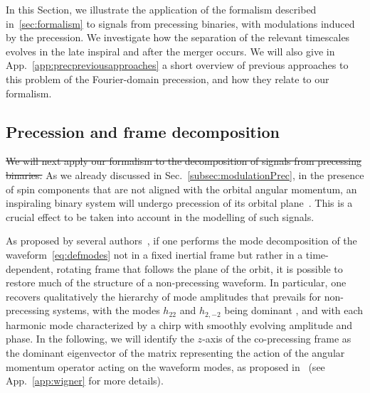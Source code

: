 \documentclass[aps,showpacs,twocolumn,
prd,superscriptaddress,nofootinbib]{revtex4-1}
\newcommand{\jgb}[1]{{\color{DarkGreen} #1}}
\begin{document}
In this Section, we illustrate the application of the formalism described in~\ref{sec:formalism} to signals from precessing binaries, with modulations induced by the precession. We investigate how the separation of the relevant timescales evolves in the late inspiral and after the merger occurs. We will also give in App.~\ref{app:precpreviousapproaches} a short overview of previous approaches to this problem of the Fourier-domain precession, and how they relate to our formalism.


\subsection{Precession and frame decomposition}
\label{subsec:precdef}

\sout{We will next apply our formalism to the decomposition of signals from precessing binaries.}
As we already discussed in Sec.~\ref{subsec:modulationPrec}, in the presence of spin components that are not aligned with the orbital angular momentum, an inspiraling binary system will undergo precession of its orbital plane~\cite{Apostolatos+94, Kidder95}. This is a crucial effect to be taken into account in the modelling of such signals.

As proposed by several authors~\cite{BCV03b, BCPTV05, Schmidt+10, OShaughnessy+11, Boyle+11}, if one performs the mode decomposition of the waveform~\eqref{eq:defmodes} not in a fixed inertial frame but rather in a time-dependent, rotating frame that follows the plane of the orbit, it is possible to restore much of the structure of a non-precessing waveform. In particular, one recovers qualitatively the hierarchy of mode amplitudes that prevails for non-precessing systems, with the modes $h_{22}$ and $h_{2,-2}$ being dominant\jgb{, and with each harmonic mode characterized by a chirp with smoothly evolving amplitude and phase}. In the following, we will identify the $z$-axis of the co-precessing frame as the dominant eigenvector of the matrix representing the action of the angular momentum operator acting on the waveform modes, as proposed in~\cite{OShaughnessy+11} (see App.~\ref{app:wigner} for more details).
\end{document}
